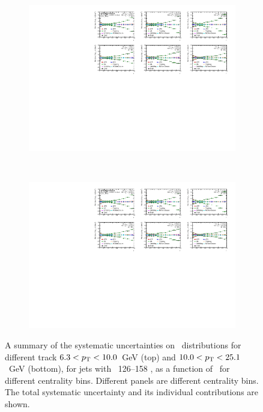 \begin{figure}
\centering
\begin{subfigure}[b]{\textwidth}
    \centering
    \includegraphics[page=5, width=\textwidth]{figures/main/systematics/Summary_ChPS_dR_sys_PbPb_error}
    \caption{}
    \label{fig:rdptr_sys_uncert2a}
\end{subfigure} \\
\begin{subfigure}[b]{\textwidth}
    \centering
    \includegraphics[page=6, width=\textwidth]{figures/main/systematics/Summary_ChPS_dR_sys_PbPb_error}
    \caption{}
    \label{fig:rdptr_sys_uncert2b}
\end{subfigure}\hfill
   \caption{A summary of the systematic uncertainties on \RDptr\ distributions for different track \mbox{$6.3 < \mbox{$p_{\mathrm{T}}$} < 10.0$ GeV} (top) and \mbox{$10.0 < \mbox{$p_{\mathrm{T}}$} < 25.1$ GeV} (bottom), for jets with \pt\ 126--158 \GeV, as a function of \rvar\ for different centrality bins.
Different panels are different centrality bins.
The total systematic uncertainty and its individual contributions are shown.}
\label{fig:rdptr_sys_uncert2}
\end{figure}

